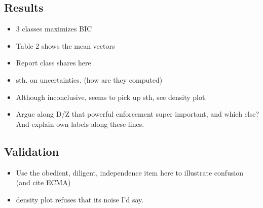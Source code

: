 \subsection{Results}
\begin{itemize}
	\item 3 classes maximizes BIC
	\item Table 2 shows the mean vectors
	\item Report class shares here
	\item sth. on uncertainties. (how are they computed)
	\item Although inconclusive, seems to pick up sth, see density plot.
	\item Argue along D/Z that powerful enforcement super important, and which else? And explain own labels along these lines.
\end{itemize}


\subsection{Validation}
\begin{itemize}
	\item Use the obedient, diligent, independence item here to illustrate confusion (and cite ECMA)
	\item density plot refuses that its noise I'd say.
\end{itemize}